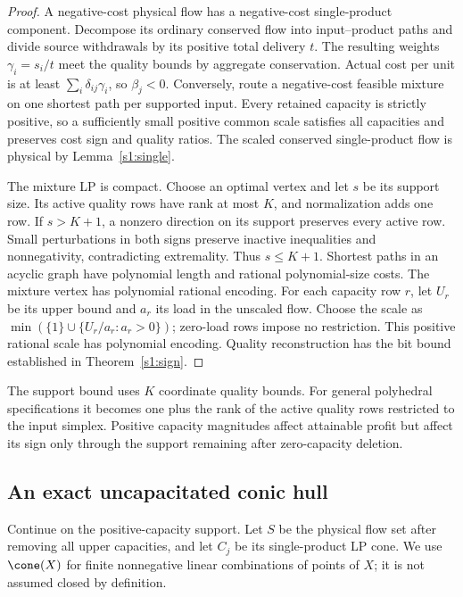 \begin{proof}
A negative-cost physical flow has a negative-cost single-product
component. Decompose its ordinary conserved flow into input--product
paths and divide source withdrawals by its positive total delivery $t$.
The resulting weights $\gamma_i=s_i/t$ meet the quality bounds by
aggregate conservation. Actual cost per unit is at least
$\sum_i\delta_{ij}\gamma_i$, so $\beta_j<0$.
Conversely, route a negative-cost feasible mixture on one shortest path
per supported input. Every retained capacity is strictly positive, so
a sufficiently small positive common scale satisfies all capacities
and preserves cost sign and quality ratios. The scaled conserved
single-product flow is physical by Lemma~\ref{s1:single}.

The mixture LP is compact. Choose an optimal vertex and let $s$ be its
support size. Its active quality rows have rank at most $K$, and
normalization adds one row. If $s>K+1$, a nonzero direction on its
support preserves every active row. Small perturbations in both signs
preserve inactive inequalities and nonnegativity, contradicting
extremality. Thus $s\le K+1$. Shortest paths in an acyclic graph have
polynomial length and rational polynomial-size costs. The mixture
vertex has polynomial rational encoding. For each capacity row $r$, let
$U_r$ be its upper bound and $a_r$ its load in the unscaled flow. Choose
the scale as $\min(\{1\}\cup\{U_r/a_r:a_r>0\})$; zero-load rows impose
no restriction. This positive rational scale has polynomial encoding.
Quality reconstruction has
the bit bound established in Theorem~\ref{s1:sign}.
\end{proof}

The support bound uses $K$ coordinate quality bounds. For general
polyhedral specifications it becomes one plus the rank of the active
quality rows restricted to the input simplex. Positive capacity
magnitudes affect attainable profit but affect its sign only through
the support remaining after zero-capacity deletion.

\subsection{An exact uncapacitated conic hull}\label{s1:conic}

Continue on the positive-capacity support. Let $S$ be the physical flow
set after removing all upper capacities, and let $C_j$ be its
single-product LP cone. We use $\cone(X)$ for finite nonnegative linear
combinations of points of $X$; it is not assumed closed by definition.

